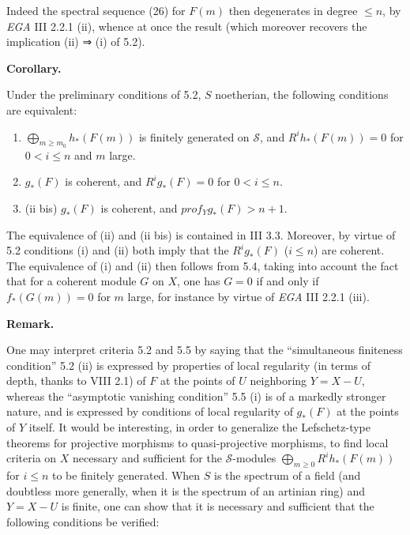 \documentclass[
  11pt,
  a4paper,
]{book}
\providecommand{\tightlist}{%
  \setlength{\itemsep}{0pt}\setlength{\parskip}{0pt}}
\begin{document}
Indeed the spectral sequence (26) for \(F(m)\) then degenerates in
degree \(\leqslant n\), by \emph{EGA} III 2.2.1 (ii), whence at once the
result (which moreover recovers the implication (ii) ⇒ (i) of 5.2).

\textbf{Corollary.}

Under the preliminary conditions of 5.2, \(S\) noetherian, the following
conditions are equivalent:

\begin{enumerate}
\def\labelenumi{\arabic{enumi}.}
\tightlist
\item
  \(\bigoplus_{m\geqslant m_{0}} h_{\ast}(F(m))\) is finitely generated
  on \(\mathcal{S}\), and \(R^{i}h_{\ast}(F(m)) = 0\) for
  \(0 < i \leqslant n\) and \(m\) large.
\item
  \(g_{\ast}(F)\) is coherent, and \(R^{i}g_{\ast}(F) = 0\) for
  \(0 < i \leqslant n\).
\item
  (ii bis) \(g_{\ast}(F)\) is coherent, and
  \(prof_{Y} g_{\ast}(F) > n + 1\).
\end{enumerate}

The equivalence of (ii) and (ii bis) is contained in III 3.3. Moreover,
by virtue of 5.2 conditions (i) and (ii) both imply that the
\(R^{i}g_{\ast}(F)\) (\(i \leqslant n\)) are coherent. The equivalence
of (i) and (ii) then follows from 5.4, taking into account the fact that
for a coherent module \(G\) on \(X\), one has \(G = 0\) if and only if
\(f_{\ast}(G(m)) = 0\) for \(m\) large, for instance by virtue of
\emph{EGA} III 2.2.1 (iii).

\textbf{Remark.}

One may interpret criteria 5.2 and 5.5 by saying that the ``simultaneous
finiteness condition'' 5.2 (ii) is expressed by properties of local
regularity (in terms of depth, thanks to VIII 2.1) of \(F\) at the
points of \(U\) neighboring \(Y = X -
U\), whereas the ``asymptotic vanishing condition'' 5.5 (i) is of a
markedly stronger nature, and is expressed by conditions of local
regularity of \(g_{\ast}(F)\) at the points of \(Y\) itself. It would be
interesting, in order to generalize the Lefschetz-type theorems for
projective morphisms to quasi-projective morphisms, to find local
criteria on \(X\) necessary and sufficient for the
\(\mathcal{S}\)-modules \(\bigoplus_{m\geqslant 0} R^{i}h_{\ast}(F(m))\)
for \(i
\leqslant n\) to be finitely generated. When \(S\) is the spectrum of a
field (and doubtless more generally, when it is the spectrum of an
artinian ring) and \(Y = X - U\) is finite, one can show that it is
necessary and sufficient that the following conditions be verified:
\end{document}
